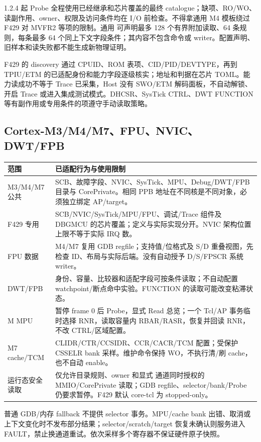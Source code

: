 \documentclass[UTF8,a4paper,11pt,oneside,fontset=none]{ctexart}
\newcommand{\code}[1]{\texttt{\detokenize{#1}}}
\begin{document}
1.2.4 起 Probe 全程使用已经继承和芯片覆盖的最终 catalogue；缺项、RO/WO、读副作用、owner、权限及访问条件均在 I/O 前检查。不得拿通用 M4 模板绕过 F429 对 MVFR2 等项的限制。通用 \code{discovery} 可声明最多 128 个有界附加读取、64 条规则，每条最多 64 个同上下文字段条件；其内容不包含命令或 writer。配置声明、旧样本和读失败都不能生成新物理证明。

F429 的 discovery 通过 CPUID、ROM 表项、CID/PID/DEVTYPE，再到 TPIU/ETM 的已适配身份和能力字段逐级核实；地址和判据在芯片 TOML。能力读成功不等于 Trace 已采集，Host 没有 SWO/ETM 解码面板，不自动解锁、开启 Trace 或进入集成测试模式。DHCSR、SysTick CTRL、DWT FUNCTION 等有副作用或专用条件的项遵守手动读取策略。

\subsection{Cortex-M3/M4/M7、FPU、NVIC、DWT/FPB}
\begin{longtable}{@{}P{31mm}P{130mm}@{}}
\toprule 范围 & 已适配行为与使用限制\\\midrule\endhead
M3/M4/M7 公共 & SCB、故障字段、NVIC、SysTick、MPU、Debug/DWT/FPB 目录与 CorePrivate。相同 PPB 地址在不同核是不同对象，必须独立绑定 AP/target。\\
F429 专用 & SCB/NVIC/SysTick/MPU/FPU、调试/Trace 组件及 DBGMCU 的芯片覆盖；定义与实际实现分开。NVIC 架构位置上限不等于实际 IRQ 数。\\
FPU 数据 & M4/M7 复用 GDB regfile；支持值/位格式及 S/D 重叠视图，先检查 ID、布局与实际后端。没有自动授予 D/S/FPSCR 系统 writer。\\
DWT/FPB & 身份、容量、比较器和适配字段可按条件读取；不自动配置 watchpoint/断点命中实验。FUNCTION 的读取可能改变粘滞状态。\\
M MPU & 暂停 frame 0 后 Probe，显式 Read 总览；一个 Tcl/AP 事务临时选择 RNR，读取容量内 RBAR/RASR，恢复并回读 RNR，不改 CTRL/区域配置。\\
M7 cache/TCM & CLIDR/CTR/CCSIDR、CCR/CACR/TCM 配置；受保护 CSSELR bank 采样。维护命令保持 WO，不执行清/刷 cache，也不自动 enable。\\
运行态安全读取 & 仅允许目录规则、owner 和显式 \code{while_running=true} 通道同时授权的 MMIO/CorePrivate 读取；GDB regfile、selector/bank/Probe 仍要求暂停。F429 默认 core-tcl 为 stopped-only。\\\bottomrule
\end{longtable}
普通 GDB/内存 fallback 不提供 selector 事务。MPU/cache bank 出错、取消或上下文变化时不发布部分结果；selector/scratch/target 恢复未确认则服务进入 FAULT，禁止换通道重试。依次采样多个寄存器不保证硬件原子快照。
\end{document}
